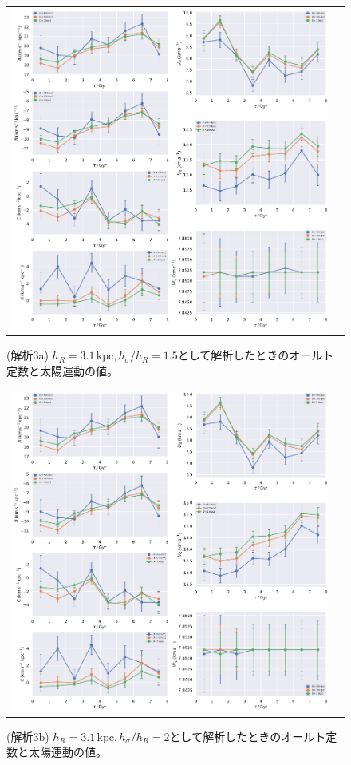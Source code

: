 \begin{figure}
   \centering
\begin{tabular}{cc}
\includegraphics[width=16cm]{fig/3a.pdf}
\end{tabular}
    \caption{(解析3a) $h_R=3.1\,\mathrm{kpc}, h_{\sigma}/h_R=1.5$として解析したときのオールト定数と太陽運動の値。}
    \label{figObs3a}
\end{figure}

\begin{figure}
   \centering
\begin{tabular}{cc}
\includegraphics[width=16cm]{fig/3b.pdf}
\end{tabular}
    \caption{(解析3b) $h_R=3.1\,\mathrm{kpc}, h_{\sigma}/h_R=2$として解析したときのオールト定数と太陽運動の値。}
    \label{figObs3b}
\end{figure}

